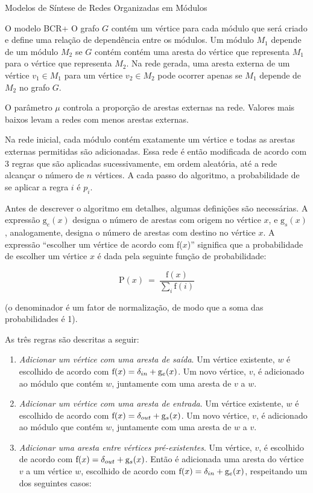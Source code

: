 \begin{section}{Modelos de Síntese de Redes Organizadas em Módulos}
\begin{subsection}{O modelo BCR+}
O grafo $G$ contém um vértice para cada módulo que será criado e define uma relação de dependência entre os módulos. Um módulo $M_1$ depende de um módulo $M_2$ se $G$ contém contém uma aresta do vértice que representa $M_1$ para o vértice que representa $M_2$. Na rede gerada, uma aresta externa de um vértice $v_1 \in M_1$ para um vértice $v_2 \in M_2$ pode ocorrer apenas se $M_1$ depende de $M_2$ no grafo $G$.

O parâmetro $\mu$ controla a proporção de arestas externas na rede. Valores mais baixos levam a redes com menos arestas externas.

Na rede inicial, cada módulo contém exatamente um vértice e todas as arestas externas permitidas são adicionadas. Essa rede é então modificada de acordo com 3 regras que são aplicadas sucessivamente, em ordem aleatória, até a rede alcançar o número de $n$ vértices. A cada passo do algoritmo, a probabilidade de se aplicar a regra $i$ é $p_i$.

Antes de descrever o algoritmo em detalhes, algumas definições são necessárias. A expressão $\mathrm{g}_e(x)$ designa o número de arestas com origem no vértice $x$, e $\mathrm{g}_s(x)$, analogamente, designa o número de arestas com destino no vértice $x$. A expressão ``escolher um vértice de acordo com f($x$)'' significa que a probabilidade de escolher um vértice $x$ é dada pela seguinte função de probabilidade:

$$
  \mathrm{P}(x) ~=~ \frac{ \mathrm{f}(x) }
  { \displaystyle\sum_{i} \mathrm{f}(i) }
$$

(o denominador é um fator de normalização, de modo que a soma das probabilidades é 1).

As três regras são descritas a seguir:

\begin{enumerate}

\item \emph{Adicionar um vértice com uma aresta de saída}. Um vértice existente, $w$ é escolhido de acordo com $\mathrm{f}(x) = \delta_{in} + \mathrm{g}_e(x)$. Um novo vértice, $v$, é adicionado ao módulo que contém $w$, juntamente com uma aresta de $v$ a $w$.

\item \emph{Adicionar um vértice com uma aresta de entrada}. Um vértice existente, $w$ é escolhido de acordo com $\mathrm{f}(x) = \delta_{out} + \mathrm{g}_s(x)$. Um novo vértice, $v$, é adicionado ao módulo que contém $w$, juntamente com uma aresta de $w$ a $v$.

\item \emph{Adicionar uma aresta entre vértices pré-existentes}. Um vértice, $v$, é escolhido de acordo com $\mathrm{f}(x) = \delta_{out} + \mathrm{g}_s(x)$. Então é adicionada uma aresta do vértice $v$ a um vértice $w$, escolhido de acordo com $\mathrm{f}(x) = \delta_{in} + \mathrm{g}_e(x)$, respeitando um dos seguintes casos:


\end{enumerate}
\end{subsection}
\end{section}
